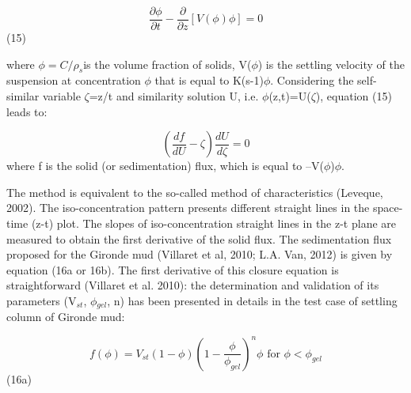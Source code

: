 \begin{equation*}
\dfrac{\partial \phi }{\partial t} -\dfrac{\partial }{\partial z} \left[
V(\phi )\phi \right] =0 
\end{equation*}%
\hspace{5mm} \hspace{5mm} \hspace{5mm} \hspace{5mm} \hspace{5mm} \hspace{5mm}
\hspace{5mm} (15)

where $\phi =C/\rho _{s} $is the volume fraction of solids, V($\phi$) is the
settling velocity of the suspension at concentration $\phi$ that is equal to
K(s-1)$\phi$.\newline
Considering the self-similar variable $\zeta$=z/t and similarity solution U,
i.e. $\phi$(z,t)=U($\zeta$), equation (15) leads to:

\begin{equation*}
\left( \dfrac{df}{dU} -\zeta \right) \dfrac{dU}{d\zeta } =0 
\end{equation*}%
\hspace{5mm} \hspace{5mm} \hspace{5mm} \hspace{5mm} \hspace{5mm} \hspace{5mm}
\hspace{5mm} where f is the solid (or sedimentation) flux, which is equal to
--V($\phi$)$\phi$.

The method is equivalent to the so-called method of characteristics
(Leveque, 2002). The iso-concentration pattern presents different straight
lines in the space-time (z-t) plot. The slopes of iso-concentration straight
lines in the z-t plane are measured to obtain the first derivative of the
solid flux. The sedimentation flux proposed for the Gironde mud (Villaret et
al, 2010; L.A. Van, 2012) is given by equation (16a or 16b). The first
derivative of this closure equation is straightforward (Villaret et al.
2010): the determination and validation of its parameters (V$_{st}$, $\phi$$%
_{gel}$, n) has been presented in details in the test case of settling
column of Gironde mud:

\begin{equation*}
f(\phi )=V_{st} (1-\phi )\left( 1-\dfrac{\phi }{\phi _{gel} } \right) ^{n}
\phi \text{\ \ \ for\ \ \ } \phi <\phi _{gel} 
\end{equation*}%
\hspace{5mm} \hspace{5mm} \hspace{5mm} \hspace{5mm} \hspace{5mm} (16a)

